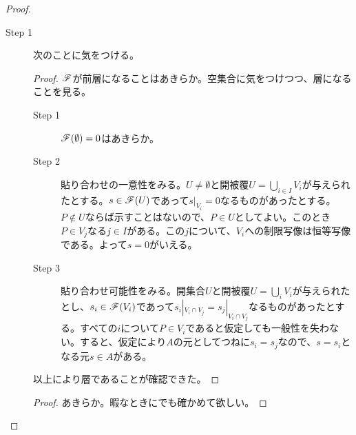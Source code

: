 \begin{proof} ${}$
  \begin{description}
    \item[Step 1] 次のことに気をつける。
    \begin{proof}
      $\mathscr{F}$が前層になることはあきらか。空集合に気をつけつつ、層になることを見る。
      \begin{description}
        \item[Step 1] $\mathscr{F}(\emptyset)=0$はあきらか。
        \item[Step 2] 貼り合わせの一意性をみる。$U \neq \emptyset$と開被覆$U = \bigcup_{i \in I} V_i$が与えられたとする。$s \in \mathscr{F}(U)$であって$s|_{V_i}=0$なるものがあったとする。$P \notin U$ならば示すことはないので、$P \in U$としてよい。このとき$P \in V_j$なる$j \in I$がある。この$j$について、$V_i$への制限写像は恒等写像である。よって$s=0$がいえる。
        \item[Step 3] 貼り合わせ可能性をみる。開集合$U$と開被覆$U = \bigcup_{i } V_i$が与えられたとし、$s_i \in \mathscr{F}(V_i)$であって$s_i |_{V_i \cap V_j} = s_j |_{V_i \cap V_j}$なるものがあったとする。すべての$i$について$P \in V_i$であると仮定しても一般性を失わない。すると、仮定により$A$の元としてつねに$s_i = s_j$なので、$s = s_i$となる元$s \in A$がある。
      \end{description}
      以上により層であることが確認できた。
    \end{proof}

    \begin{proof}
      あきらか。暇なときにでも確かめて欲しい。
    \end{proof}


\end{description}
\end{proof}
